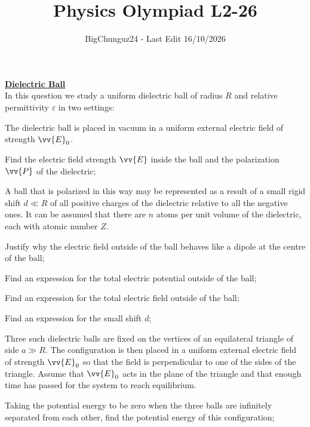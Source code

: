 \documentclass[a4paper]{article}
\title{\Huge Physics Olympiad L2-26}
\author{BigChunguz24 - Last Edit 16/10/2026}
\date{}
\begin{document}
	\maketitle
	
	\Problem
	\textbf{\underline{Dielectric Ball}}
	\\
	In this question we study a uniform dielectric ball of radius $R$ and relative permittivity $\varepsilon$ in two settings:
	\begin{description}[leftmargin=0pt, labelwidth=0pt,]
		\item[Setting 1:] The dielectric ball is placed in vacuum in a uniform external electric field of strength $\vv{E}_0$.
		\begin{description}[
			leftmargin=!,
			labelwidth=\widthof{$\bullet$},
			labelindent=\widthof{$\bullet\bullet$}
			]
			\item[$\bullet$] Find the electric field strength $\vv{E}$ inside the ball and the polarization $\vv{P}$ of the dielectric; 
		\end{description}
		\begin{description}[
			leftmargin=!,
			labelwidth=\widthof{$\bullet$},
			labelindent=\widthof{}
			]
			\item[] A ball that is polarized in this way may be represented as a result of a small rigid shift $d \ll R$ of all positive charges of the dielectric relative to all the negative ones. It can be assumed that there are $n$ atoms per unit volume of the dielectric, each with atomic number $Z$.
		\end{description}
		\begin{description}[
			leftmargin=!,
			labelwidth=\widthof{$\bullet$},
			labelindent=\widthof{$\bullet\bullet$}
			]
			\item[$\bullet$] Justify why the electric field outside of the ball behaves like a dipole at the centre of the ball;
			\item[$\bullet$] Find an expression for the total electric potential outside of the ball;
			\item[$\bullet$] Find an expression for the total electric field outside of the ball;
			\item[$\bullet$] Find an expression for the small shift $d$;
		\end{description}
		\item[Setting 2:] Three such dielectric balls are fixed on the vertices of an equilateral triangle of side $a \gg R$. The configuration is then placed in a uniform external electric field of strength $\vv{E}_0$ so that the field is perpendicular to one of the sides of the triangle. Assume that $\vv{E}_0$ acts in the plane of the triangle and that enough time has passed for the system to reach equilibrium.
		\begin{description}[
			leftmargin=!,
			labelwidth=\widthof{$\bullet$},
			labelindent=\widthof{$\bullet\bullet$}
			]
			\item[$\bullet$] Taking the potential energy to be zero when the three balls are infinitely separated from each other, find the potential energy of this configuration;
		\end{description}
	\end{description}
\end{document}
